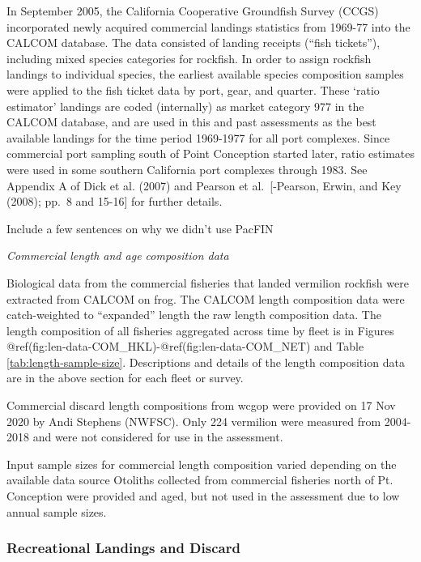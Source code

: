 \documentclass[11pt,
  english,
  a4paper,
]{article}
\begin{document}
In September 2005, the California Cooperative Groundfish Survey (CCGS) incorporated newly acquired commercial landings statistics from 1969-77 into the CALCOM database. The data consisted of landing receipts (``fish tickets''), including mixed species categories for rockfish. In order to assign rockfish landings to individual species, the earliest available species composition samples were applied to the fish ticket data by port, gear, and quarter. These `ratio estimator' landings are coded (internally) as market category 977 in the CALCOM database, and are used in this and past assessments as the best available landings for the time period 1969-1977 for all port complexes. Since commercial port sampling south of Point Conception started later, ratio estimates were used in some southern California port complexes through 1983. See Appendix A of Dick et al. {(2007)\leavevmode\tagmcend\tagstructend} and Pearson et al.~{[}-{Pearson, Erwin, and Key (2008)\leavevmode\tagmcend\tagstructend}; pp.~8 and 15-16{]} for further details.

Include a few sentences on why we didn't use PacFIN

\emph{Commercial length and age composition data}

Biological data from the commercial fisheries that landed vermilion rockfish were extracted from CALCOM on frog. The CALCOM length composition data were catch-weighted to ``expanded'' length the raw length composition data. The length composition of all fisheries aggregated across time by fleet is in Figures @ref(fig:len-data-COM\_HKL)-@ref(fig:len-data-COM\_NET) and Table \ref{tab:length-sample-size}. Descriptions and details of the length composition data are in the above section for each fleet or survey.

Commercial discard length compositions from \Gls{wcgop} were provided on 17 Nov 2020 by Andi Stephens (NWFSC). Only 224 vermilion were measured from 2004-2018 and were not considered for use in the assessment.

Input sample sizes for commercial length composition varied depending on the available data source Otoliths collected from commercial fisheries north of Pt. Conception were provided and aged, but not used in the assessment due to low annual sample sizes.


\hypertarget{recreational-landings-and-discard}{%
\subsubsection{Recreational Landings and Discard}\label{recreational-landings-and-discard}}
\end{document}
